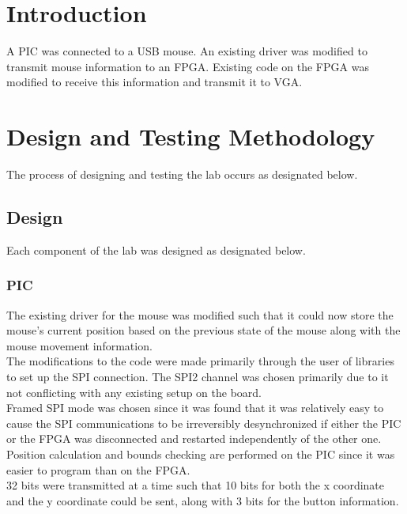 \documentclass{article}
\begin{document}

\section{Introduction}

A PIC was connected to a USB mouse. An existing driver was modified to transmit mouse information to an FPGA. Existing code on the FPGA was modified to receive this information and transmit it to VGA.\\


\section{Design and Testing Methodology}

The process of designing and testing the lab occurs as designated below.

\subsection{Design}

Each component of the lab was designed as designated below.


\subsubsection{PIC}

The existing driver for the mouse was modified such that it could now store the mouse's current position based on the previous state of the mouse along with the mouse movement information.\\

The modifications to the code were made primarily through the user of libraries to set up the SPI connection. The SPI2 channel was chosen primarily due to it not conflicting with any existing setup on the board.\\

Framed SPI mode was chosen since it was found that it was relatively easy to cause the SPI communications to be irreversibly desynchronized if either the PIC or the FPGA was disconnected and restarted independently of the other one.\\

Position calculation and bounds checking are performed on the PIC since it was easier to program than on the FPGA.\\

32 bits were transmitted at a time such that 10 bits for both the x coordinate and the y coordinate could be sent, along with 3 bits for the button information.\\
\end{document}
